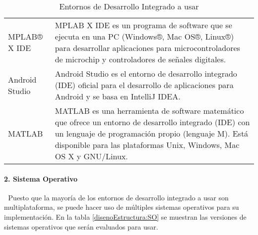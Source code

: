 \begin{table}[htbp]
	\begin{center}
		\begin{tabular}{|p{3cm}|p{10cm}|}
			\hline
			\thead{Nombre}&\thead{Descripción}\\
			\hline
			\hline
			MPLAB® X IDE &  MPLAB X IDE es un programa de software que se ejecuta en una PC (Windows®, Mac OS®, Linux®) para desarrollar aplicaciones para microcontroladores de microchip y controladores de señales digitales.\\
			\hline
			Android Studio & Android Studio es el entorno de desarrollo integrado (IDE) oficial para el desarrollo de aplicaciones para Android y se basa en IntelliJ IDEA.\\
			\hline
			MATLAB & MATLAB es una herramienta de software matemático que ofrece un entorno de desarrollo integrado (IDE) con un lenguaje de programación propio (lenguaje M). Está disponible para las plataformas Unix, Windows, Mac OS X y GNU/Linux.\\
			\hline
		\end{tabular}
		\caption{Entornos de Desarrollo Integrado a usar}
		\label{disenoEstructura:IDE}
	\end{center}
\end{table}


\paragraph{2. Sistema Operativo}  \textcolor{White}{.} \newline
Puesto que la mayoría de los entornos de desarrollo integrado a usar son multiplataforma, se puede hacer uso de múltiples sistemas operativos para su implementación. En la tabla \ref{disenoEstructura:SO} se muestran las versiones de sistemas operativos que serán evaluados para usar.\\

